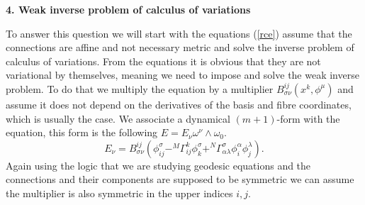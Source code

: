 \documentclass[english]{article}
\begin{document}
\begin{center}
{\bf 4. Weak inverse problem of calculus of variations}
\end{center}
To answer this question we will start with the equations (\ref{rce}) assume that the connections are affine and not necessary metric and solve the inverse problem of calculus of variations. From the equations it is obvious that they are not variational by themselves, meaning we need to impose and solve the weak inverse problem. To do that we multiply the equation by a multiplier $B^{ij}_{\sigma\nu}(x^k,\phi^\mu)$ and assume it does not depend on the derivatives of the basis and fibre coordinates, which is usually the case. We associate a dynamical $(m+1)$-form with the equation, this form is the following $E=E_\nu\omega^\nu\wedge\omega_0$.
\begin{equation}
\label{EL}
E_\nu=B_{\sigma\nu}^{ij}\left(\phi^\sigma_{ij}-^M\Gamma^k_{ij}\phi^\sigma_k+^N\Gamma^\sigma_{\alpha\lambda}\phi^\alpha_i\phi^\lambda_j\right).
\end{equation}
Again using the logic that we are studying geodesic equations and the connections and their components are supposed to be symmetric we can assume the multiplier is also symmetric in the upper indices $i, j$.
\end{document}
